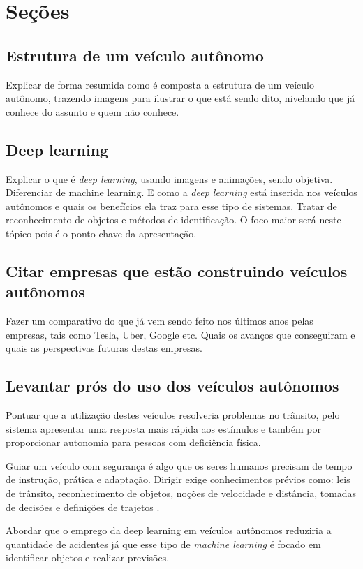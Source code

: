 \documentclass[12pt,a4paper]{article}
\begin{document}
    \section{Seções}

    \subsection{Estrutura de um veículo autônomo}
    \par Explicar de forma resumida como é composta a estrutura de um veículo autônomo, trazendo imagens para ilustrar o que está sendo dito, nivelando que já conhece do assunto e quem não conhece. 

    \subsection{Deep learning}
    \par Explicar o que é \emph{deep learning}, usando imagens e animações, sendo objetiva. Diferenciar de machine learning. E como a \emph{deep learning} está inserida nos veículos autônomos e quais os benefícios ela traz para esse tipo de sistemas. Tratar de reconhecimento de objetos e métodos de identificação. O foco maior será neste tópico pois é o ponto-chave da apresentação.

    \subsection{Citar empresas que estão construindo veículos autônomos}
    \par Fazer um comparativo do que já vem sendo feito nos últimos anos pelas empresas, tais como Tesla, Uber, Google etc. Quais os avanços que conseguiram e quais as perspectivas futuras destas empresas.

    \subsection{Levantar prós do uso dos veículos autônomos}
    \par Pontuar que a utilização destes veículos resolveria problemas no trânsito, pelo sistema apresentar uma resposta mais rápida aos estímulos e também por proporcionar autonomia para pessoas com deficiência física.
    \par Guiar um veículo com segurança é algo que os seres humanos precisam de tempo de instrução, prática e adaptação. Dirigir exige conhecimentos prévios como: leis de trânsito, reconhecimento de objetos, noções de velocidade e distância, tomadas de decisões e definições de trajetos \cite{1}. 
    \par Abordar que o emprego da deep learning em veículos autônomos reduziria a quantidade de acidentes já que esse tipo de \emph{machine learning} é focado em identificar objetos e realizar previsões.
\end{document}
